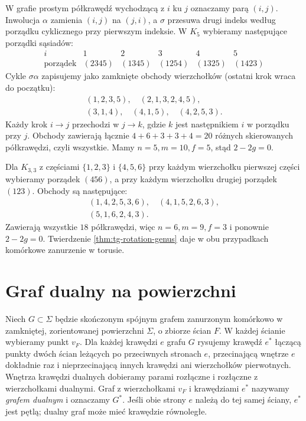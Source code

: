 \begin{przyklad}
\label{ex:tg-torus-rotations}
W grafie prostym półkrawędź wychodzącą z $i$ ku $j$
oznaczamy parą $(i,j)$. Inwolucja $\alpha$ zamienia
$(i,j)$ na $(j,i)$, a $\sigma$ przesuwa drugi indeks
według porządku cyklicznego przy pierwszym indeksie.
W $K_5$ wybieramy następujące porządki sąsiadów:
\[
\begin{array}{c|ccccc}
i&1&2&3&4&5\\ \hline
\text{porządek}&(2345)&(1345)&(1254)&(1325)&(1423)
\end{array}
\]
Cykle $\sigma\alpha$ zapisujemy jako zamknięte obchody
wierzchołków (ostatni krok wraca do początku):
\[
\begin{gathered}
(1,2,3,5),\quad (2,1,3,2,4,5),\\
(3,1,4),\quad (4,1,5),\quad (4,2,5,3).
\end{gathered}
\]
Każdy krok $i\to j$ przechodzi w $j\to k$,
gdzie $k$ jest następnikiem $i$ w porządku przy $j$.
Obchody zawierają łącznie $4+6+3+3+4=20$ różnych
skierowanych półkrawędzi, czyli wszystkie.
Mamy $n=5,m=10,f=5$, stąd $2-2g=0$.

Dla $K_{3,3}$ z częściami $\{1,2,3\}$ i $\{4,5,6\}$
przy każdym wierzchołku pierwszej części wybieramy
porządek $(456)$, a przy każdym wierzchołku drugiej
porządek $(123)$. Obchody są następujące:
\[
\begin{gathered}
(1,4,2,5,3,6),\quad (4,1,5,2,6,3),\\
(5,1,6,2,4,3).
\end{gathered}
\]
Zawierają wszystkie $18$ półkrawędzi, więc
$n=6,m=9,f=3$ i ponownie $2-2g=0$.
Twierdzenie \ref{thm:tg-rotation-genus} daje w obu
przypadkach komórkowe zanurzenie w torusie.
\end{przyklad}

\section{Graf dualny na powierzchni}
\label{sec:tg-dual}

\begin{definicja}
Niech $G\subset\Sigma$ będzie skończonym spójnym grafem
zanurzonym komórkowo w zamkniętej, zorientowanej
powierzchni $\Sigma$, o zbiorze ścian $F$. W każdej ścianie wybieramy
punkt $v_F$. Dla każdej krawędzi $e$ grafu $G$ rysujemy
krawędź $e^*$ łączącą punkty dwóch ścian leżących po
przeciwnych stronach $e$, przecinającą wnętrze $e$ dokładnie
raz i nieprzecinającą innych krawędzi ani wierzchołków
pierwotnych. Wnętrza krawędzi dualnych dobieramy parami
rozłączne i rozłączne z wierzchołkami dualnymi.
Graf z wierzchołkami $v_F$ i krawędziami $e^*$
nazywamy \emph{grafem dualnym} i oznaczamy $G^*$.
Jeśli obie strony $e$ należą do tej samej ściany,
$e^*$ jest pętlą; dualny graf może mieć krawędzie równoległe.
\end{definicja}

